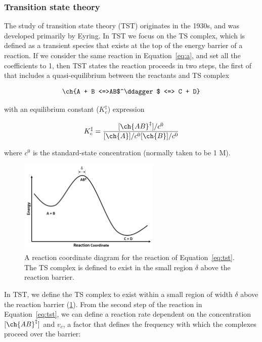 \begin{doublespace}
\subsubsection{Transition state theory}

The study of transition state theory (TST) originates in the 1930s, and was
developed primarily by Eyring.\cite{McQuarrie1997,Steinfeld1998} In TST we
focus on the TS complex, which is defined as a transient species that exists
at the top of the energy barrier of a reaction. If we consider the same
reaction in Equation~\ref{eq:a}, and set all the coefficients to 1, then TST
states the reaction proceeds in two steps, the first of that includes a
quasi-equilibrium between the reactants and TS complex

\begin{equation}
  \ch{A + B <=>AB$^\ddagger$ <=> C + D}
  \label{eq:tst}
\end{equation}

\noindent with an equilibrium constant ($K_c^{\ddagger}$) expression

\begin{equation}
  K_c^{\ddagger} = \frac{[\ch{AB}^\ddagger]/c^0}{[\ch{A}]/c^0[\ch{B}]/c^0}
\label{eq:K}
\end{equation}

\noindent where $c^0$ is the standard-state concentration (normally taken to be
1 M).

\begin{figure}[htb]
    \centering
    \includegraphics[width=0.6\textwidth]{figures/TST-PES.png}
    \caption[A reaction coordinate diagram for a generic reaction.]{A reaction coordinate diagram for the reaction of Equation~\ref{eq:tst}. The TS complex is defined to exist in the small region $\delta$ above the reaction barrier.}
\label{fig:tst-pes}
\end{figure}

In TST, we define the TS complex to exist within a small region of width
$\delta$ above the reaction barrier (\ref{fig:tst-pes}). From the second step of
the reaction in Equation~\ref{eq:tst}, we can define a reaction rate dependent
on the concentration $[\ch{AB}^\ddagger]$ and $v_c$, a factor that defines the
frequency with which the complexes proceed over the barrier:


\end{doublespace}
